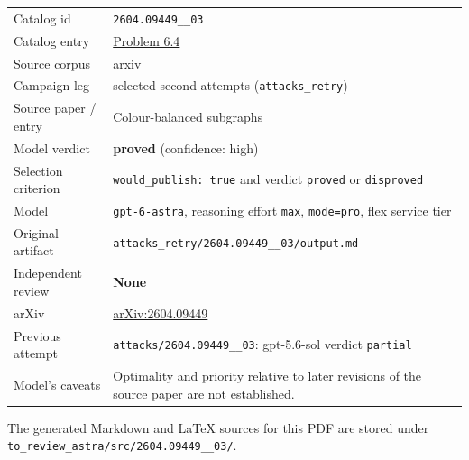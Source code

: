\documentclass[
  11pt,
  a4paper,
]{article}
\newcounter{none} %
\begin{document}
{\def\LTcaptype{none} %
\begin{longtable}[]{@{}
  >{\raggedright\arraybackslash}p{}
  >{\raggedright\arraybackslash}p{}@{}}
\toprule\noalign{}
\endhead
\bottomrule\noalign{}
\endlastfoot
Catalog id & \texttt{2604.09449\_\_03} \\
Catalog entry &
\href{https://graph-theory-ai.github.io/graph-conjectures/arxiv/2604.09449__03/}{Problem
6.4} \\
Source corpus & arxiv \\
Campaign leg & selected second attempts (\texttt{attacks\_retry}) \\
Source paper / entry & Colour-balanced subgraphs \\
Model verdict & \textbf{proved} (confidence: high) \\
Selection criterion & \texttt{would\_publish:\ true} and verdict
\texttt{proved} or \texttt{disproved} \\
Model & \texttt{gpt-6-astra}, reasoning effort \texttt{max},
\texttt{mode=pro}, flex service tier \\
Original artifact &
\texttt{attacks\_retry/2604.09449\_\_03/output.md} \\
Independent review & \textbf{None} \\
arXiv & \href{https://arxiv.org/abs/2604.09449}{arXiv:2604.09449} \\
Previous attempt & \texttt{attacks/2604.09449\_\_03}: gpt-5.6-sol
verdict \texttt{partial} \\
Model's caveats & Optimality and priority relative to later revisions of
the source paper are not established. \\
\end{longtable}
}

The generated Markdown and LaTeX sources for this PDF are stored under
\texttt{to\_review\_astra/src/2604.09449\_\_03/}.
\end{document}

